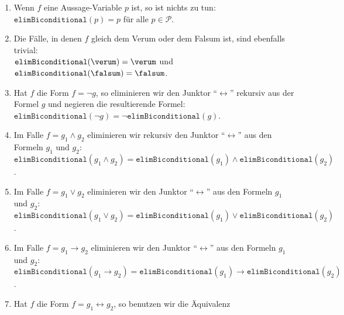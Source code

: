 \begin{enumerate}
\item Wenn $f$ eine
      Aussage-Variable $p$ ist, so ist nichts zu tun:
      \\[0.2cm]
      \hspace*{1.3cm}
      $\texttt{elimBiconditional}(p) = p$ \quad für alle $p \in \mathcal{P}$.
\item Die Fälle, in denen $f$ gleich dem Verum oder dem Falsum ist, sind ebenfalls trivial:
      \\[0.2cm]
      \hspace*{1.3cm}
      $\texttt{elimBiconditional}(\verum) = \verum$ \quad und \quad
      $\texttt{elimBiconditional}(\falsum) = \falsum$.
\item Hat $f$ die Form $f = \neg g$, so eliminieren wir den Junktor
      ``$\leftrightarrow$'' rekursiv aus der Formel $g$ und negieren die resultierende Formel: \\[0.2cm]
      \hspace*{1.3cm} 
      $\texttt{elimBiconditional}(\neg g) = \neg \texttt{elimBiconditional}(g)$.
\item Im Falle $f = g_1 \wedge g_2$ eliminieren wir rekursiv den Junktor
      ``$\leftrightarrow$'' aus den Formeln $g_1$ und $g_2$: \\[0.2cm]
      \hspace*{1.3cm} 
      $\texttt{elimBiconditional}(g_1 \wedge g_2) = \texttt{elimBiconditional}(g_1) \wedge \texttt{elimBiconditional}(g_2)$.
\item Im Falle $f = g_1 \vee g_2$ eliminieren wir den Junktor
      ``$\leftrightarrow$'' aus den Formeln $g_1$ und $g_2$: \\[0.2cm]
      \hspace*{1.3cm} 
      $\texttt{elimBiconditional}(g_1 \vee g_2) = \texttt{elimBiconditional}(g_1) \vee \texttt{elimBiconditional}(g_2)$.
\item Im Falle $f = g_1 \rightarrow g_2$ eliminieren wir den Junktor
      ``$\leftrightarrow$'' aus den Formeln $g_1$ und $g_2$: \\[0.2cm]
      \hspace*{1.3cm} 
      $\texttt{elimBiconditional}(g_1 \rightarrow g_2) = \texttt{elimBiconditional}(g_1) \rightarrow \texttt{elimBiconditional}(g_2)$.
\item Hat $f$ die Form $f = g_1 \leftrightarrow g_2$, so benutzen wir die
      Äquivalenz \\[0.2cm]
      \hspace*{1.3cm} 

\end{enumerate}
